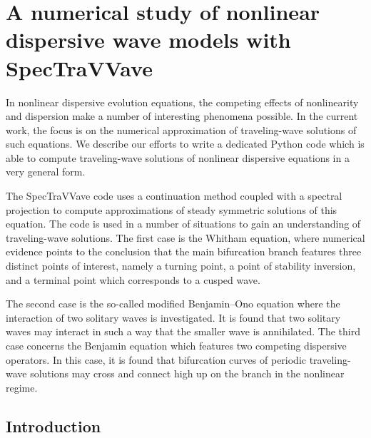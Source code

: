 \section{A numerical study of nonlinear dispersive wave models with SpecTraVVave}

In nonlinear dispersive evolution equations, the competing effects of nonlinearity and dispersion 
make a number of interesting phenomena possible. In the current work, the focus is on the numerical
approximation of traveling-wave solutions of such equations.
We describe our efforts to write a dedicated \textsf{Python}
code which is able to compute traveling-wave solutions of nonlinear
dispersive equations in a very general form.

The \textsf{SpecTraVVave} code uses a continuation method coupled with a spectral projection
to compute approximations of steady symmetric solutions of this equation.
The code is used in a number of situations to gain an
understanding of traveling-wave solutions. The first case is the Whitham
equation, where numerical evidence points to the conclusion that the main 
bifurcation branch features three distinct points of interest, namely a turning point, 
a point of stability inversion, and a terminal point which corresponds to a cusped wave.

The second case is the so-called modified Benjamin--Ono equation where
the interaction of two solitary waves is investigated. It is found
that two solitary waves may interact in such a way
that the smaller wave is annihilated. The third case concerns
the Benjamin equation which features two competing dispersive operators.
In this case, it is found that bifurcation curves of periodic traveling-wave
solutions may cross and connect high up on the branch in the nonlinear regime.


\subsection{Introduction}
\label{intro}

